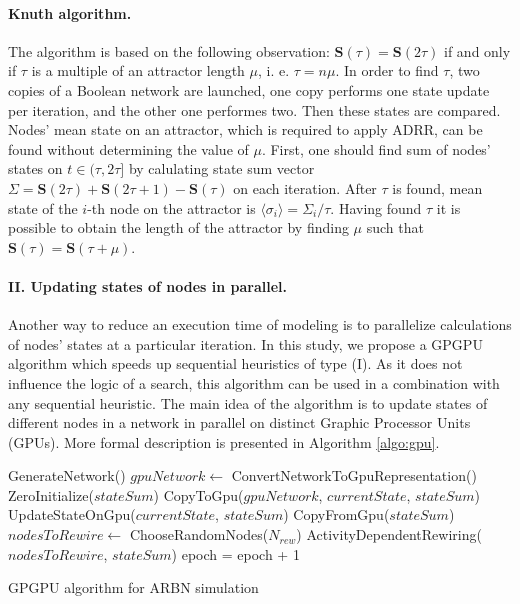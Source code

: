 \documentclass[procedia]{easychair}
\begin{document}
	\paragraph{Knuth algorithm.} The algorithm is based on the following observation: $\mathbf{S}(\tau) = \mathbf{S}(2\tau)$ if and only if $\tau$ is a multiple of an attractor length $\mu$, i. e. $\tau = n\mu$. In order to find $\tau$, two copies of a Boolean network are launched, one copy performs one state update per iteration, and the other one performes two. Then these states are compared. Nodes' mean state on an attractor, which is required to apply ADRR, can be found without determining the value of $\mu$. First, one should find sum of nodes' states on $t \in (\tau, 2\tau]$ by calulating state sum vector $\Sigma = \mathbf{S}(2\tau) + \mathbf{S}(2\tau + 1) - \mathbf{S}(\tau)$ on each iteration. After $\tau$ is found, mean state of the $i$-th node on the attractor is $\langle\sigma_i\rangle = \Sigma_i / \tau$. Having found $\tau$ it is possible to obtain the length of the attractor by finding $\mu$ such that $\mathbf{S}(\tau) = \mathbf{S}(\tau + \mu)$.

\paragraph{II. Updating states of nodes in parallel.} Another way to reduce an execution time of modeling is to parallelize calculations of nodes' states at a particular iteration. In this study, we propose a GPGPU algorithm which speeds up sequential heuristics of type (I). As it does not influence the logic of a search, this algorithm can be used in a combination with any sequential heuristic. The main idea of the algorithm is to update states of different nodes in a network in parallel on distinct Graphic Processor Units (GPUs). More formal description is presented in Algorithm \ref{algo:gpu}.

	\begin{algorithm}[ht!]
		\label{algo:gpu}
		GenerateNetwork()\;
		{
			$gpuNetwork \leftarrow$ ConvertNetworkToGpuRepresentation()\;
			ZeroInitialize($stateSum$)\;
			CopyToGpu($gpuNetwork$, $currentState$, $stateSum$)\;
			{ 	
				UpdateStateOnGpu($currentState$, $stateSum$)\;
			}
			CopyFromGpu($stateSum$)\;
			$nodesToRewire \leftarrow$ ChooseRandomNodes($N_{rew}$)\;
			ActivityDependentRewiring($nodesToRewire$, $stateSum$)\;
			epoch = epoch + 1\;
		}
		\caption{GPGPU algorithm for ARBN simulation}
	\end{algorithm}
\end{document}
